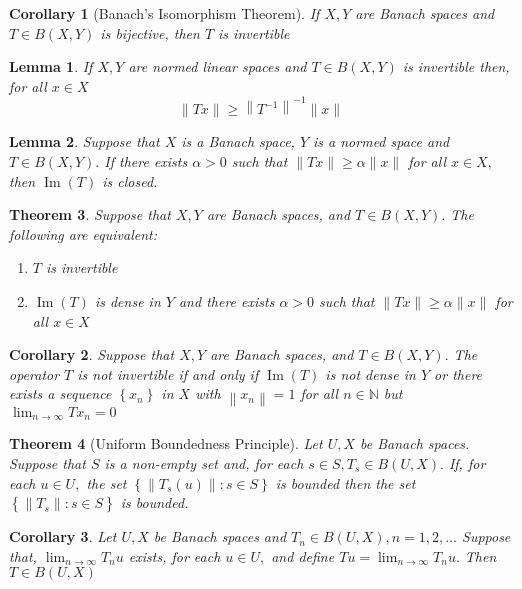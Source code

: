 \documentclass[10pt]{paper}
\newtheorem{theorem}{Theorem}[section]
\newtheorem{corollary}{Corollary}[section]
\newtheorem{lemma}[theorem]{Lemma}
\begin{document}
\begin{corollary}[Banach's Isomorphism Theorem]
    If $X, Y$ are Banach spaces and $T \in B(X, Y)$ is bijective, then $T$ is invertible
\end{corollary}

\begin{lemma}
    If $X, Y$ are normed linear spaces and $T \in B(X, Y)$ is invertible then, for all $x \in X$
    $$
        \|T x\| \geq\left\|T^{-1}\right\|^{-1}\|x\|
    $$
\end{lemma}

\begin{lemma}
    Suppose that $X$ is a Banach space, $Y$ is a normed space and $T \in B(X, Y) .$ If there exists $\alpha>0$ such that $\|T x\| \geq \alpha\|x\|$ for all $x \in X,$ then $\operatorname{Im}(T)$ is closed.
\end{lemma}

\begin{theorem}
    Suppose that $X, Y$ are Banach spaces, and $T \in B(X, Y) .$ The following are equivalent:
    \begin{enumerate}
        \item $T$ is invertible
        \item $\operatorname{Im}(T)$ is dense in $Y$ and there exists $\alpha>0$ such that $\|T x\| \geq \alpha\|x\|$ for all $x \in X$
    \end{enumerate}
\end{theorem}

\begin{corollary}
    Suppose that $X, Y$ are Banach spaces, and $T \in B(X, Y) .$ The operator $T$ is not invertible if and only if $\operatorname{Im}(T)$ is not dense in $Y$ or there exists a sequence $\left\{x_{n}\right\}$ in $X$ with $\left\|x_{n}\right\|=1$ for all $n \in \mathbb{N}$ but $\lim _{n \rightarrow \infty} T x_{n}=0$
\end{corollary}

\begin{theorem}[Uniform Boundedness Principle]
    Let $U, X$ be Banach spaces. Suppose that $S$ is a non-empty set and, for each $s \in S, T_{s} \in B(U, X) .$ If, for each $u \in U,$ the set $\left\{\left\|T_{s}(u)\right\|: s \in S\right\}$ is bounded then the set $\left\{\left\|T_{s}\right\|: s \in S\right\}$ is bounded.
\end{theorem}

\begin{corollary}
    Let $U, X$ be Banach spaces and $T_{n} \in B(U, X), n=1,2, \ldots$ Suppose that, $\lim _{n \rightarrow \infty} T_{n} u$ exists, for each $u \in U,$ and define $T u=\lim _{n \rightarrow \infty} T_{n} u .$ Then $T \in B(U, X)$
\end{corollary}
\end{document}
